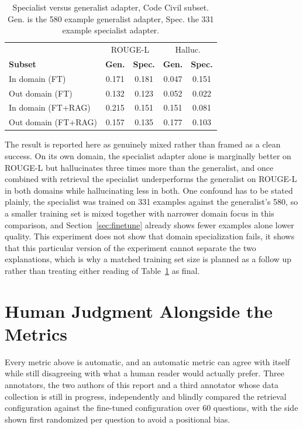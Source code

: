 \documentclass[11pt, a4paper]{article}
\begin{document}
\begin{table}[H]
\centering
\small
\begin{tabular}{lcccc}
\toprule
& \multicolumn{2}{c}{ROUGE-L} & \multicolumn{2}{c}{Halluc.} \\
\textbf{Subset} & \textbf{Gen.} & \textbf{Spec.} & \textbf{Gen.} & \textbf{Spec.} \\
\midrule
In domain (FT) & 0.171 & 0.181 & 0.047 & 0.151 \\
Out domain (FT) & 0.132 & 0.123 & 0.052 & 0.022 \\
In domain (FT+RAG) & 0.215 & 0.151 & 0.151 & 0.081 \\
Out domain (FT+RAG) & 0.157 & 0.135 & 0.177 & 0.103 \\
\bottomrule
\end{tabular}
\caption{Specialist versus generalist adapter, Code Civil subset. Gen. is the 580 example generalist adapter, Spec. the 331 example specialist adapter.}
\label{tab:specialist}
\end{table}

The result is reported here as genuinely mixed rather than framed as a clean success. On its own domain, the specialist adapter alone is marginally better on ROUGE-L but hallucinates three times more than the generalist, and once combined with retrieval the specialist underperforms the generalist on ROUGE-L in both domains while hallucinating less in both. One confound has to be stated plainly, the specialist was trained on 331 examples against the generalist's 580, so a smaller training set is mixed together with narrower domain focus in this comparison, and Section~\ref{sec:finetune} already shows fewer examples alone lower quality. This experiment does not show that domain specialization fails, it shows that this particular version of the experiment cannot separate the two explanations, which is why a matched training set size is planned as a follow up rather than treating either reading of Table~\ref{tab:specialist} as final.

\section{Human Judgment Alongside the Metrics}

Every metric above is automatic, and an automatic metric can agree with itself while still disagreeing with what a human reader would actually prefer. Three annotators, the two authors of this report and a third annotator whose data collection is still in progress, independently and blindly compared the retrieval configuration against the fine-tuned configuration over 60 questions, with the side shown first randomized per question to avoid a positional bias.
\end{document}
